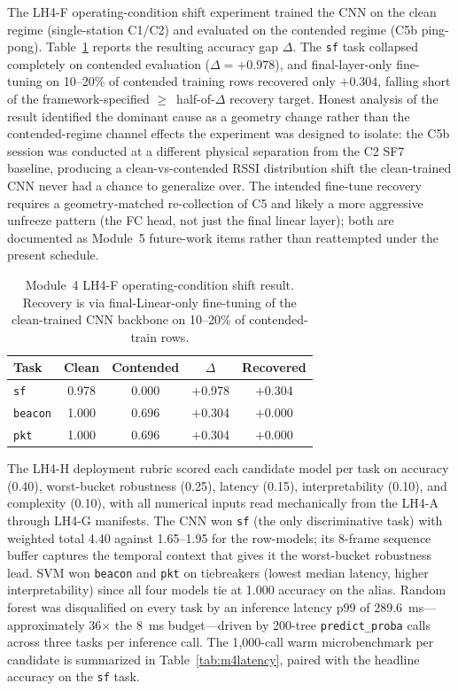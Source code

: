 \documentclass[conference]{IEEEtran}
\begin{document}
The LH4-F operating-condition shift experiment trained the CNN on the clean regime (single-station C1/C2) and evaluated on the contended regime (C5b ping-pong). Table~\ref{tab:m4shift} reports the resulting accuracy gap $\Delta$. The \texttt{sf} task collapsed completely on contended evaluation ($\Delta = +0.978$), and final-layer-only fine-tuning on 10--20\% of contended training rows recovered only $+0.304$, falling short of the framework-specified $\geq$~half-of-$\Delta$ recovery target. Honest analysis of the result identified the dominant cause as a geometry change rather than the contended-regime channel effects the experiment was designed to isolate: the C5b session was conducted at a different physical separation from the C2 SF7 baseline, producing a clean-vs-contended RSSI distribution shift the clean-trained CNN never had a chance to generalize over. The intended fine-tune recovery requires a geometry-matched re-collection of C5 and likely a more aggressive unfreeze pattern (the FC head, not just the final linear layer); both are documented as Module~5 future-work items rather than reattempted under the present schedule.

\begin{table}[t]
\centering
\caption{Module~4 LH4-F operating-condition shift result. Recovery is via final-Linear-only fine-tuning of the clean-trained CNN backbone on 10--20\% of contended-train rows.}
\label{tab:m4shift}
\begin{tabular}{l c c c c}
\toprule
\textbf{Task} & \textbf{Clean} & \textbf{Contended} & \textbf{$\Delta$} & \textbf{Recovered} \\
\midrule
\texttt{sf}     & 0.978 & 0.000 & $+$0.978 & $+$0.304 \\
\texttt{beacon} & 1.000 & 0.696 & $+$0.304 & $+$0.000 \\
\texttt{pkt}    & 1.000 & 0.696 & $+$0.304 & $+$0.000 \\
\bottomrule
\end{tabular}
\end{table}

The LH4-H deployment rubric scored each candidate model per task on accuracy (0.40), worst-bucket robustness (0.25), latency (0.15), interpretability (0.10), and complexity (0.10), with all numerical inputs read mechanically from the LH4-A through LH4-G manifests. The CNN won \texttt{sf} (the only discriminative task) with weighted total 4.40 against 1.65--1.95 for the row-models; its 8-frame sequence buffer captures the temporal context that gives it the worst-bucket robustness lead. SVM won \texttt{beacon} and \texttt{pkt} on tiebreakers (lowest median latency, higher interpretability) since all four models tie at 1.000 accuracy on the alias. Random forest was disqualified on every task by an inference latency p99 of 289.6~ms---approximately 36$\times$ the 8~ms budget---driven by 200-tree \texttt{predict\_proba} calls across three tasks per inference call. The 1{,}000-call warm microbenchmark per candidate is summarized in Table~\ref{tab:m4latency}, paired with the headline accuracy on the \texttt{sf} task.
\end{document}
